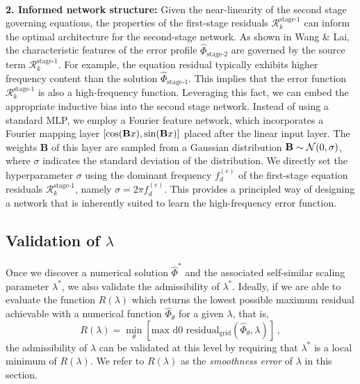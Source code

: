 \documentclass[fleqn,11pt]{wlscirep}
\begin{document}
 \\
{\bf 2. Informed network structure:}
Given the near-linearity of the second stage governing equations, the properties of the first-stage residuals $\mathcal{R}^\text{stage-1}_k$ can inform the optimal architecture for the second-stage network. As shown in Wang \& Lai\cite{Wang-Lai:multistage-nn}, the characteristic features of the error profile $\hat{\Phi}_\text{stage-2}$ are governed by the source term $\mathcal{R}^\text{stage-1}_k$. For example, the equation residual typically exhibits higher frequency content than the solution $\hat{\Phi}_\text{stage-1}$. This implies that the error function $\mathcal{R}^\text{stage-1}_k$ is also a high-frequency function. Leveraging this fact, we can embed the appropriate inductive bias into the second stage network. Instead of using a standard MLP, we employ a Fourier feature network, which incorporates a Fourier mapping layer $[\cos({\bf B}x), \sin({\bf B}x)]$ placed after the linear input layer. The weights {\bf B} of this layer are sampled from a Gaussian distribution ${\bf B}\sim \mathcal{N}(0, \sigma)$, where $\sigma$ indicates the standard deviation of the distribution. We directly set the hyperparameter $\sigma$ using the dominant frequency $f_d^{(e)}$ of the first-stage equation residuals $\mathcal{R}^\text{stage-1}_k$, namely $\sigma = 2\pi f_d^{(e)}$. This provides a principled way of designing a network that is inherently suited to learn the high-frequency error function.


\subsection*{Validation of $\lambda$}

Once we discover a numerical solution $\hat{\Phi}^*$ and the associated self-similar scaling parameter $\lambda^*$, we also validate the admissibility of $\lambda^*$. Ideally, if we are able to evaluate the function $R(\lambda)$ which returns the lowest possible maximum residual achievable with a numerical function $\hat{\Phi}_\theta$ for a given $\lambda$, that is,
\begin{equation}
    R(\lambda) = \min_\theta \left[ \text{max d0 residual}_\text{grid} (\hat{\Phi}_\theta, \lambda) \right] \,,
\end{equation}
the admissibility of $\lambda$ can be validated at this level by requiring that $\lambda^*$ is a local minimum of $R(\lambda)$. We refer to $R(\lambda)$ as the \textit{smoothness error} of $\lambda$ in this section.
\end{document}
